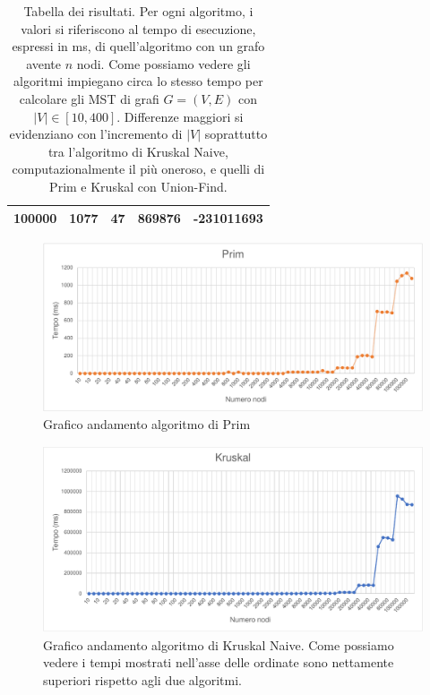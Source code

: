 \documentclass[a4paper]{article}
\begin{document}
\begin{table}[H]
\begin{minipage}[t]{10cm}
\begin{tabular}{|c|c|c|c|c|}
      100000        & 1077          & 47                  & 869876           & -231011693   \\ \hline
    \end{tabular}
  \end{minipage}
  \caption{Tabella dei risultati. Per ogni algoritmo, i valori si riferiscono al tempo di esecuzione, espressi in ms, di quell'algoritmo con un grafo avente $n$ nodi. Come possiamo vedere gli algoritmi impiegano circa lo stesso tempo per calcolare gli MST di grafi $G = (V, E)$ con $|V| \in [10, 400]$. Differenze maggiori si evidenziano con l'incremento di $|V|$ soprattutto tra l'algoritmo di Kruskal Naive, computazionalmente il più oneroso, e quelli di Prim e Kruskal con Union-Find.}
  \label{t1}
\end{table}
\newpage
\begin{figure}[H]
  \centering
  \includegraphics[scale=1]{grafici/prim.pdf}
  \caption{Grafico andamento algoritmo di Prim}
\end{figure}

\begin{figure}[H]
  \centering
  \includegraphics[scale=1]{grafici/kruskal.pdf}
  \caption{Grafico andamento algoritmo di Kruskal Naive. Come possiamo vedere i tempi mostrati nell'asse delle ordinate sono nettamente superiori rispetto agli due algoritmi.}
\end{figure}
\end{document}

